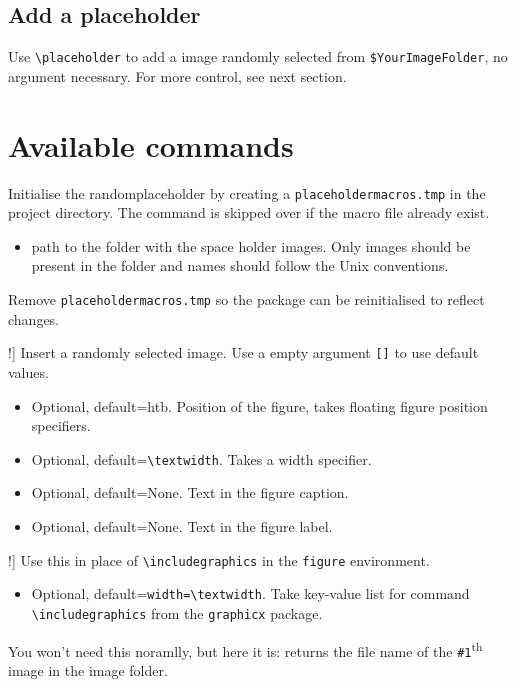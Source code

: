 \documentclass[12pt]{article}
\begin{document}
    \subsection{Add a placeholder}
    Use \lstinline{\placeholder} to add a image randomly selected from \lstinline{$YourImageFolder}, no argument necessary. 
    For more control, see next section.

    \section{Available commands}
    \begin{description}
        \item[\lstinline!\placeholderinit{#1}!] 
        Initialise the randomplaceholder by creating a \linebreak \lstinline!placeholdermacros.tmp! in the project directory. The command is skipped over if the macro file already exist.
            \begin{itemize}
                \item[\lstinline!#1!] path to the folder with the space holder images. Only images should be present in the folder and names should follow the Unix conventions.
            \end{itemize}
        \item[\lstinline!\placeholderclean!] Remove \lstinline!placeholdermacros.tmp! so the package can be reinitialised to reflect changes. 
        \item[\lstinline!\placeholder[#1][#2][#3][#4]!] Insert a randomly selected image. Use a empty argument \lstinline{[]} to use default values.
            \begin{itemize}
                \item[\lstinline{#1}] Optional, default=htb. Position of the figure, takes floating figure position specifiers.
                \item[\lstinline{#2}] Optional, default=\lstinline{\textwidth}. Takes a width specifier.
                \item[\lstinline{#3}] Optional, default=None. Text in the figure caption.
                \item[\lstinline{#4}] Optional, default=None. Text in the figure label.  
            \end{itemize}
        \item[\lstinline!\includeplaceholder[#1]!] Use this in place of \lstinline!\includegraphics! in the \lstinline{figure} environment.
            \begin{itemize}
                \item[\lstinline{#1}] Optional, default=\lstinline{width=\textwidth}. Take key-value list for command \lstinline{\includegraphics} from the \lstinline{graphicx} package.
            \end{itemize}
        \item[\lstinline!\placeholderimage{#1}!] You won't need this noramlly, but here it is: returns the file name of the \lstinline{#1}\textsuperscript{th} image in the image folder. 
    \end{description}
\end{document}
